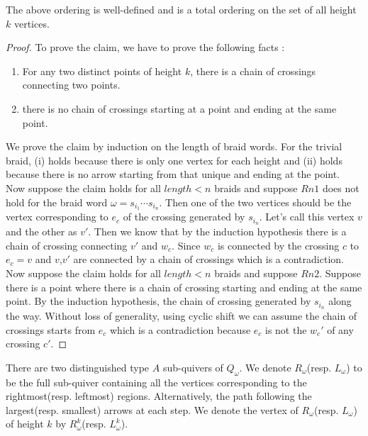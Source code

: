 \begin{theorem}
	The above ordering is well-defined and is a total ordering on the set of all height $k$ vertices.
\end{theorem}

\begin{proof} 
To prove the claim, we have to prove the following facts :
\begin{enumerate}[label=(\roman*)]
	\item For any two distinct points of height $k$, there is a chain of crossings connecting two points.
	\item there is no chain of crossings starting at a point and ending at the same point.
\end{enumerate}
We prove the claim by induction on the length of braid words. For the trivial braid, (\Rn{1}) holds because there is only one vertex for each height and (\Rn{2}) holds because there is no arrow starting from that unique and ending at the point.\\
 Now suppose the claim holds for all $length < n$ braids and suppose $Rn{1}$ does not hold for the braid word $\omega = s_{i_1}\cdots s_{i_n}$. Then one of the two vertices should be the vertex corresponding to $e_c$ of the crossing generated by $s_{i_n}$. Let's call this vertex $v$ and the other as $v'$. Then we know that by the induction hypothesis there is a chain of crossing connecting $v'$ and $w_c$. Since $w_c$ is connected by the crossing $c$ to $e_c = v$ and $v$,$v'$ are connected by a chain of crossings which is a contradiction. \\
 Now suppose the claim holds for all $length < n$ braids and suppose $Rn{2}$. Suppose there is a point where there is a chain of crossing starting and ending at the same point. By the induction hypothesis, the chain of crossing generated by $s_{i_n}$ along the way. Without loss of generality, using cyclic shift we can assume the chain of crossings starts from $e_c$ which is a contradiction because $e_c$ is not the $w_c'$ of any crossing $c'$.
\end{proof}


\begin{definition}
	 There are two distinguished type $A$ sub-quivers of $Q_{\omega}$. We denote $R_{\omega}$(resp. $L_{\omega}$) to be the full sub-quiver containing all the vertices corresponding to the rightmost(resp. leftmost) regions. Alternatively, the path following the largest(resp. smallest) arrows at each step. We denote the vertex of $R_{\omega}$(resp. $L_{\omega}$) of height $k$ by $R^k_{\omega}$(resp. $L^k_{\omega}$).
\end{definition}

